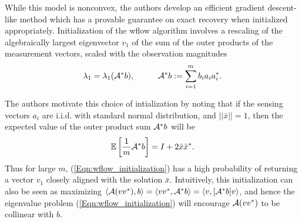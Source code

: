 While this model is nonconvex, the authors develop an efficient gradient descent-like method which has a provable guarantee on exact recovery when initialized appropriately.  Initialization of the wflow algorithm involves a rescaling of the algebraically largest eigenvector $v_1$ of the sum of the outer products of the measurement vectors, scaled with the observation magnitudes
\begin{equation}			\label{Eqn:wflow_initialization}
\lambda_1 = \lambda_1({\mathcal A}^* b),  \hspace{1cm} {\mathcal A}^*b := \sum\limits_{\substack{i=1}}^{\substack{m}}b_i a_i a_i^*.
\end{equation}


The authors motivate this choice of intialization by noting that if the sensing vectors $a_i$ are i.i.d. with standard normal distribution, and $||\bar{x}|| = 1$, then the expected value of the outer product sum ${\mathcal A}^*b$ will be
\begin{equation} 		\label{Eqn:wflow_expected_value}
{\mathbb E} \left[ \frac{1}{m}{\mathcal A}^* b \right] = I + 2\bar{x}\bar{x}^*.
\end{equation}
Thus for large $m$, (\ref{Eqn:wflow_initialization}) has a high probability of returning a vector $v_1$ closely aligned with the solution $\bar{x}$. Intuitively, this initialization can also be seen as maximizing $\langle {\mathcal A}(vv^*), b \rangle	= \langle v v^*, {\mathcal A}^* b \rangle = \langle v, [{\mathcal A}^* b] v \rangle$, and hence the eigenvalue problem (\ref{Eqn:wflow_initialization}) will encourage ${\mathcal A}(vv^*)$ to be collinear with $b$.

